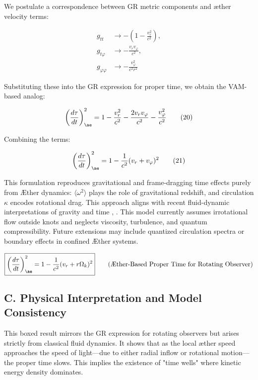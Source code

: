 We postulate a correspondence between GR metric components and æther velocity terms:

\begin{equation}
\begin{aligned}
g_{tt} &\rightarrow -\left(1 - \frac{v_r^2}{c^2}\right), \\
g_{t\varphi} &\rightarrow -\frac{v_r v_\varphi}{c^2}, \\
g_{\varphi\varphi} &\rightarrow -\frac{v_\varphi^2}{c^2 r^2}
\end{aligned}
\tag{19}
\end{equation}

Substituting these into the GR expression for proper time, we obtain the VAM-based analog:

\begin{equation}
\left( \frac{d\tau}{dt} \right)^2_{\ae} = 1 - \frac{v_r^2}{c^2} - \frac{2v_r v_\varphi}{c^2} - \frac{v_\varphi^2}{c^2}
\tag{20}
\end{equation}

Combining the terms:

\begin{equation}
\left( \frac{d\tau}{dt} \right)^2_{\ae} = 1 - \frac{1}{c^2}(v_r + v_\varphi)^2
\tag{21}
\end{equation}

This formulation reproduces gravitational and frame-dragging time effects purely from Æther dynamics: $\langle \omega^2 \rangle$ plays the role of gravitational redshift, and circulation $\kappa$ encodes rotational drag. This approach aligns with recent fluid-dynamic interpretations of gravity and time \cite{barcelo2011analogue}, \cite{fedi2017gravity}.
This model currently assumes irrotational flow outside knots and neglects viscosity, turbulence, and quantum compressibility. Future extensions may include quantized circulation spectra or boundary effects in confined Æther systems.

\begin{equation}
\boxed{\left( \frac{d\tau}{dt} \right)^2_{\ae} = 1 - \frac{1}{c^2}(v_r + r\Omega_k)^2}
\tag{Æther-Based Proper Time for Rotating Observer}
\end{equation}

\subsection*{C. Physical Interpretation and Model Consistency}

This boxed result mirrors the GR expression for rotating observers but arises strictly from classical fluid dynamics. It shows that as the local æther speed approaches the speed of light—due to either radial inflow or rotational motion—the proper time slows. This implies the existence of "time wells" where kinetic energy density dominates.

